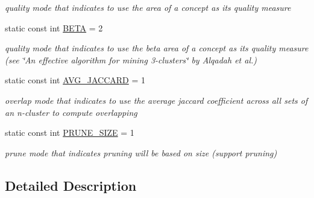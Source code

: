 \begin{DoxyCompactItemize}
\begin{DoxyCompactList}\small\item\em quality mode that indicates to use the area of a concept as its quality measure \item\end{DoxyCompactList}\item 
\hypertarget{class_lattice_algos_a3cf765cdc6bce759203597708324ee9e}{
static const int \hyperlink{class_lattice_algos_a3cf765cdc6bce759203597708324ee9e}{BETA} = 2}
\label{class_lattice_algos_a3cf765cdc6bce759203597708324ee9e}

\begin{DoxyCompactList}\small\item\em quality mode that indicates to use the beta area of a concept as its quality measure (see \char`\"{}An effective algorithm for mining 3-\/clusters\char`\"{} by Alqadah et al.) \item\end{DoxyCompactList}\item 
\hypertarget{class_lattice_algos_a24156b300d4b23d0d618f548091d0aeb}{
static const int \hyperlink{class_lattice_algos_a24156b300d4b23d0d618f548091d0aeb}{AVG\_\-JACCARD} = 1}
\label{class_lattice_algos_a24156b300d4b23d0d618f548091d0aeb}

\begin{DoxyCompactList}\small\item\em overlap mode that indicates to use the average jaccard coefficient across all sets of an n-\/cluster to compute overlapping \item\end{DoxyCompactList}\item 
\hypertarget{class_lattice_algos_a9a1d69347724b131f372706322776bbb}{
static const int \hyperlink{class_lattice_algos_a9a1d69347724b131f372706322776bbb}{PRUNE\_\-SIZE} = 1}
\label{class_lattice_algos_a9a1d69347724b131f372706322776bbb}

\begin{DoxyCompactList}\small\item\em prune mode that indicates pruning will be based on size (support pruning) \item\end{DoxyCompactList}\end{DoxyCompactItemize}


\subsection{Detailed Description}


